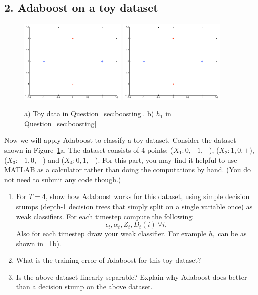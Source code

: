 \documentclass[english]{article}
\begin{document}
\subsection*{2. Adaboost on a toy dataset}

\begin{figure}[t]
  \begin{center}
    \includegraphics[width=2in]{images/toydata}
    \includegraphics[width=2in]{images/toydata_with_h1}
  \end{center}
  \caption{a) Toy data in Question~\ref{sec:boosting}. b) $h_1$ in Question~\ref{sec:boosting}}
  \label{fig:toydata}
\end{figure}

Now we will apply Adaboost to classify a toy dataset. Consider the
dataset shown in Figure~\ref{fig:toydata}a. The dataset consists of
$4$ points: ($X_1 : 0,-1,-$), ($X_2 : 1,0,+$), ($X_3 : -1,0,+$) and
($X_4 : 0,1,-$).  For this part, you may find it helpful to use MATLAB
as a calculator rather than doing the computations by hand.  (You do
not need to submit any code though.)

\begin{enumerate}
\item  For $T=4$, show how Adaboost works for this dataset,
  using simple decision stumps (depth-1 decision trees that simply
  split on a single variable once) as weak classifiers.  For each
  timestep compute the following:
  \[ \epsilon_t, \alpha_t, Z_t, D_t(i)~\forall i, \] Also for each
  timestep draw your weak classifier. For example $h_1$ can be as
  shown in ~\ref{fig:toydata}b). 

\item 
  What is the training error of Adaboost for this toy dataset?


\item 
  Is the above dataset linearly separable? Explain why Adaboost does
  better than a decision stump on the above dataset.


\end{enumerate}
\end{document}
